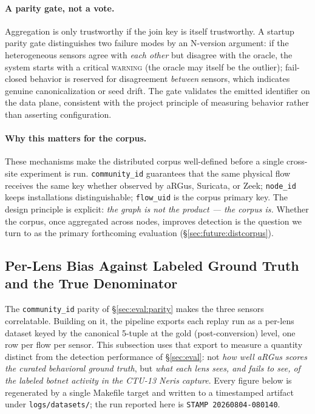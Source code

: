 \documentclass[11pt,a4paper]{article}
\begin{document}
    \paragraph{A parity gate, not a vote.}
    Aggregation is only trustworthy if the join key is itself trustworthy. A startup
    parity gate distinguishes two failure modes by an N-version argument: if the
    heterogeneous sensors agree with \emph{each other} but disagree with the oracle, the
    system starts with a critical \textsc{warning} (the oracle may itself be the outlier);
    fail-closed behavior is reserved for disagreement \emph{between} sensors, which
    indicates genuine canonicalization or seed drift. The gate validates the emitted
    identifier on the data plane, consistent with the project principle of measuring
    behavior rather than asserting configuration.

    \paragraph{Why this matters for the corpus.}
    These mechanisms make the distributed corpus well-defined before a single cross-site
    experiment is run. \texttt{community\_id} guarantees that the same physical flow
    receives the same key whether observed by aRGus, Suricata, or Zeek; \texttt{node\_id}
    keeps installations distinguishable; \texttt{flow\_uid} is the corpus primary key. The
    design principle is explicit: \emph{the graph is not the product --- the corpus is.}
    Whether the corpus, once aggregated across nodes, improves detection is the question we
    turn to as the primary forthcoming evaluation (\S\ref{sec:future:distcorpus}).

    \subsection{Per-Lens Bias Against Labeled Ground Truth and the True Denominator}
    \label{sec:eval:bias}

    The \texttt{community\_id} parity of \S\ref{sec:eval:parity} makes the three sensors
    correlatable. Building on it, the pipeline exports each replay run as a per-lens dataset
    keyed by the canonical 5-tuple at the gold (post-conversion) level, one row per flow per
    sensor. This subsection uses that export to measure a quantity distinct from the detection
    performance of \S\ref{sec:eval}: not \emph{how well aRGus scores the curated behavioral
    ground truth}, but \emph{what each lens sees, and fails to see, of the labeled botnet
    activity in the CTU-13 Neris capture}. Every figure below is regenerated by a single
    Makefile target and written to a timestamped artifact under \texttt{logs/datasets/}; the
    run reported here is \texttt{STAMP~20260804-080140}.
\end{document}
